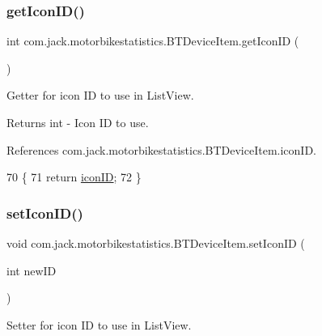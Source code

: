 \subsubsection{\texorpdfstring{get\+Icon\+I\+D()}{getIconID()}}
{\footnotesize\ttfamily int com.\+jack.\+motorbikestatistics.\+B\+T\+Device\+Item.\+get\+Icon\+ID (\begin{DoxyParamCaption}{ }\end{DoxyParamCaption})\hspace{0.3cm}{\ttfamily [inline]}}



Getter for icon ID to use in List\+View. 

\begin{DoxyReturn}{Returns}
int -\/ Icon ID to use. 
\end{DoxyReturn}


References com.\+jack.\+motorbikestatistics.\+B\+T\+Device\+Item.\+icon\+ID.


\begin{DoxyCode}
70                            \{
71         \textcolor{keywordflow}{return} \hyperlink{classcom_1_1jack_1_1motorbikestatistics_1_1_b_t_device_item_a77f7a3c228f87fa5e946fe77b310f805}{iconID};
72     \}
\end{DoxyCode}
\mbox{\label{classcom_1_1jack_1_1motorbikestatistics_1_1_b_t_device_item_a40eb2a1f46700690d2327bf37bc5ed0e}} 
\subsubsection{\texorpdfstring{set\+Icon\+I\+D()}{setIconID()}}
{\footnotesize\ttfamily void com.\+jack.\+motorbikestatistics.\+B\+T\+Device\+Item.\+set\+Icon\+ID (\begin{DoxyParamCaption}\item[{int}]{new\+ID }\end{DoxyParamCaption})\hspace{0.3cm}{\ttfamily [inline]}}



Setter for icon ID to use in List\+View. 


